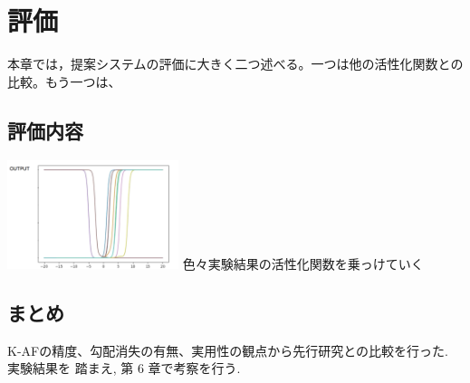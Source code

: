 \chapter{評価}
\label{evaluation}
本章では，提案システムの評価に大きく二つ述べる。一つは他の活性化関数との比較。もう一つは、

\section{評価内容}


\includegraphics[width=5cm]{asset/output.png}
色々実験結果の活性化関数を乗っけていく



\section{まとめ}

K-AFの精度、勾配消失の有無、実用性の観点から先行研究との比較を行った. 実験結果を
踏まえ, 第 6 章で考察を行う.



